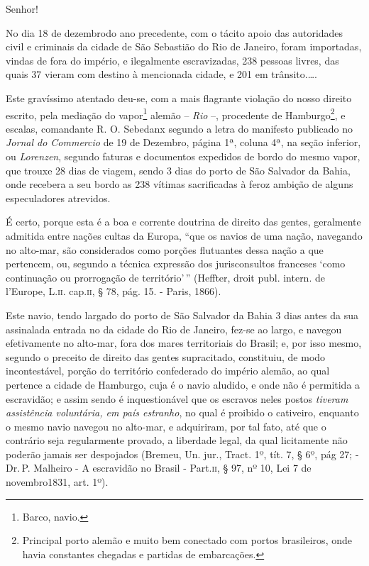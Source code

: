 Senhor!

No dia 18 de dezembrodo ano precedente, com o tácito apoio das
autoridades civil e criminais da cidade de São Sebastião do Rio de
Janeiro, foram importadas, vindas de fora do império, e ilegalmente
escravizadas, 238 pessoas livres, das quais 37 vieram com destino à
mencionada cidade, e 201 em trânsito.\ldots.

Este gravíssimo atentado deu-se, com a mais flagrante violação do nosso
direito escrito, pela mediação do vapor\footnote{ Barco, navio.} alemão
-- \emph{Rio} --, procedente de Hamburgo\footnote{ Principal porto
  alemão e muito bem conectado com portos brasileiros, onde havia
  constantes chegadas e partidas de embarcações.}, e escalas, comandante
R. O. Sebedanx segundo a letra do manifesto publicado no \emph{Jornal do
Commercio} de 19 de Dezembro, página 1ª, coluna 4ª, na seção inferior,
ou \emph{Lorenzen}, segundo faturas e documentos expedidos de bordo do
mesmo vapor, que trouxe 28 dias de viagem, sendo 3 dias do porto de São
Salvador da Bahia, onde recebera a seu bordo as 238 vítimas sacrificadas
à feroz ambição de alguns especuladores atrevidos.

É certo, porque esta é a boa e corrente doutrina de direito das gentes,
geralmente admitida entre nações cultas da Europa, ``que os navios de uma
nação, navegando no alto-mar, são considerados como porções flutuantes
dessa nação a que pertencem, ou, segundo a técnica expressão dos
jurisconsultos franceses `como continuação ou prorrogação de
território'\,'' (Heffter, droit publ. intern. de l'Europe, L.\textsc{ii}. cap.\textsc{ii},
§ 78, pág. 15. - Paris, 1866).

Este navio, tendo largado do porto de São Salvador da Bahia 3 dias antes
da sua assinalada entrada no da cidade do Rio de Janeiro, fez-se ao
largo, e navegou efetivamente no alto-mar, fora dos mares territoriais
do Brasil; e, por isso mesmo, segundo o preceito de direito das gentes
supracitado, constituiu, de modo incontestável, porção do território
confederado do império alemão, ao qual pertence a cidade de Hamburgo,
cuja é o navio aludido, e onde não é permitida a escravidão; e assim
sendo é inquestionável que os escravos neles postos \emph{tiveram
assistência voluntária, em país estranho}, no qual é proibido o
cativeiro, enquanto o mesmo navio navegou no alto-mar, e adquiriram, por
tal fato, até que o contrário seja regularmente provado, a liberdade
legal, da qual licitamente não poderão jamais ser despojados (Bremeu,
Un. jur., Tract. 1º, tít. 7, § 6º, pág 27; - Dr.\,P. Malheiro - A
escravidão no Brasil - Part.\textsc{ii}, § 97, nº 10, Lei 7 de novembro1831,
art. 1º).

